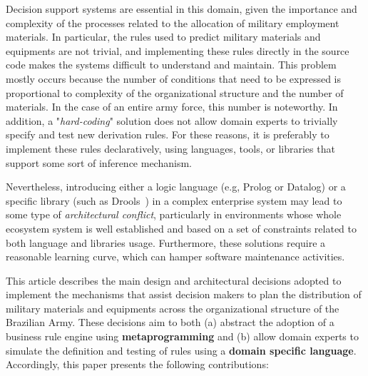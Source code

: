 Decision support systems are essential in this domain, given the importance and complexity of the processes related to the allocation of military employment materials. In particular, the rules used to predict military materials and equipments are not trivial, and implementing these rules directly in the source code makes the systems difficult to understand and maintain. This problem mostly occurs because the number of conditions that need to be expressed is proportional to complexity of the organizational structure and the number of materials. In the case of an entire army force, this number is noteworthy. In addition, a "\emph{hard-coding}" solution does not allow domain experts to trivially specify and test new derivation rules. For these reasons, it is preferably to implement these rules declaratively, using languages, tools, or libraries that support some sort of inference mechanism.


Nevertheless, introducing either a logic language (e.g, Prolog or Datalog) or a specific library (such as  Drools~\cite{browne2009}) in a complex enterprise system may lead to some type of \emph{architectural 
conflict}, particularly in environments whose whole ecosystem system is well established and based on a set of 
constraints related to both language and libraries usage. Furthermore, these solutions require a reasonable learning curve, which can hamper software maintenance activities.


This article describes the main design and architectural decisions adopted to implement the mechanisms that assist 
decision makers to plan the distribution of military materials and equipments across the organizational structure 
of the Brazilian Army. These decisions aim to both (a) abstract the adoption of a business rule engine using {\bf metaprogramming} 
and (b) allow domain experts to simulate the definition and testing of rules using 
a {\bf domain specific language}. Accordingly, this paper presents the following contributions:

